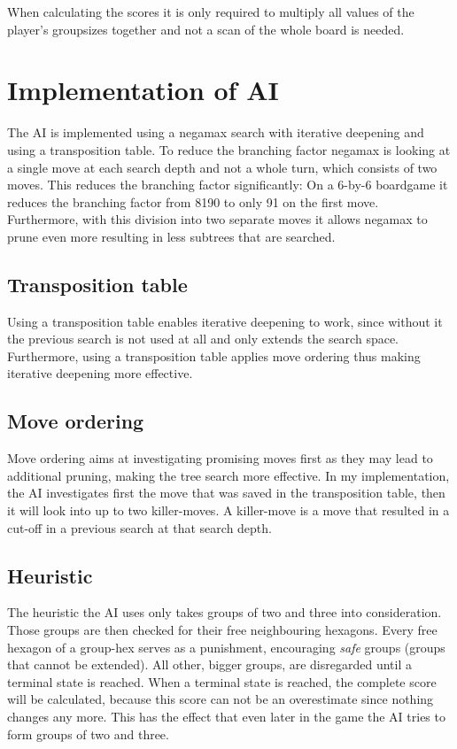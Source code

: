 \documentclass[a4paper]{article}
\begin{document}
When calculating the scores it is only required to multiply all values of the player's groupsizes together and not a scan of the whole board is needed.

\section{Implementation of AI}
The AI is implemented using a negamax search with iterative deepening and using a transposition table. To reduce the branching factor negamax is looking at a single move at each search depth and not a whole turn, which consists of two moves. This reduces the branching factor significantly: On a 6-by-6 boardgame it reduces the branching factor from 8190 to only 91 on the first move. Furthermore, with this division into two separate moves it allows negamax to prune even more resulting in less subtrees that are searched.

\subsection{Transposition table}
Using a transposition table enables iterative deepening to work, since without it the previous search is not used at all and only extends the search space. Furthermore, using a transposition table applies move ordering thus making iterative deepening more effective.

\subsection{Move ordering}
Move ordering aims at investigating promising moves first as they may lead to additional pruning, making the tree search more effective.
In my implementation, the AI investigates first the move that was saved in the transposition table, then it will look into up to two killer-moves. A killer-move is a move that resulted in a cut-off in a previous search at that search depth.

\subsection{Heuristic}
The heuristic the AI uses only takes groups of two and three into consideration. Those groups are then checked for their free neighbouring hexagons. Every free hexagon of a group-hex serves as a punishment, encouraging \textit{safe} groups (groups that cannot be extended). All other, bigger groups, are disregarded until a terminal state is reached. When a terminal state is reached, the complete score will be calculated, because this score can not be an overestimate since nothing changes any more. This has the effect that even later in the game the AI tries to form groups of two and three.
\end{document}
